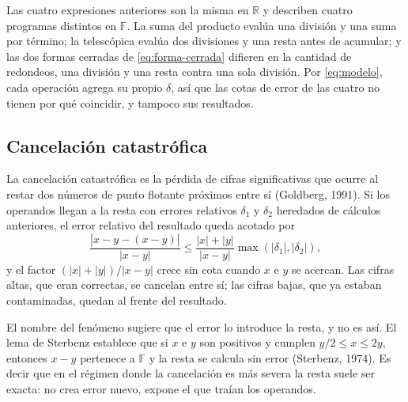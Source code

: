 Las cuatro expresiones anteriores son la misma en $\mathbb{R}$ y describen cuatro programas
distintos en $\mathbb{F}$. La suma del producto evalúa una división y una suma por término; la
telescópica evalúa dos divisiones y una resta antes de acumular; y las dos formas cerradas de
\eqref{eq:forma-cerrada} difieren en la cantidad de redondeos, una división y una resta contra una
sola división. Por \eqref{eq:modelo}, cada operación agrega su propio $\delta$, así que las cotas de
error de las cuatro no tienen por qué coincidir, y tampoco sus resultados.

\subsection{Cancelación catastrófica}
\label{subsec:cancelacion}

La cancelación catastrófica es la pérdida de cifras significativas que ocurre al restar dos números
de punto flotante próximos entre sí (Goldberg, 1991). Si los operandos llegan a la resta con errores
relativos $\delta_1$ y $\delta_2$ heredados de cálculos anteriores, el error relativo del resultado
queda acotado por
\begin{equation}
  \frac{|\widehat{x - y} - (x - y)|}{|x - y|}
  \le \frac{|x| + |y|}{|x - y|} \max(|\delta_1|, |\delta_2|) ,
  \label{eq:amplificacion}
\end{equation}
y el factor $(|x| + |y|)/|x - y|$ crece sin cota cuando $x$ e $y$ se acercan. Las cifras altas, que
eran correctas, se cancelan entre sí; las cifras bajas, que ya estaban contaminadas, quedan al
frente del resultado.

El nombre del fenómeno sugiere que el error lo introduce la resta, y no es así. El lema de Sterbenz
establece que si $x$ e $y$ son positivos y cumplen
$y/2 \le x \le 2y$, entonces $x - y$ pertenece a $\mathbb{F}$ y la resta se calcula sin error
(Sterbenz, 1974). Es decir que en el régimen donde la cancelación es más severa la resta suele ser
exacta: no crea error nuevo, expone el que traían los operandos.


